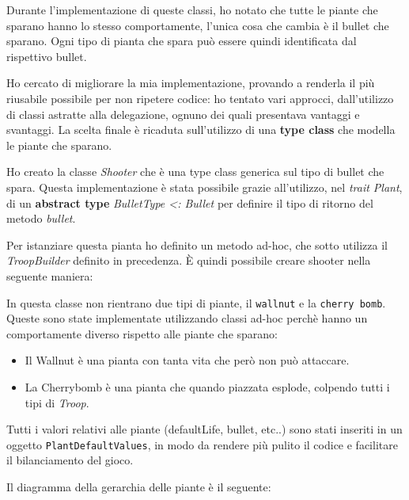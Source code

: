 Durante l'implementazione di queste classi, ho notato che tutte le piante che sparano hanno lo stesso comportamente, l'unica cosa che cambia è il bullet che sparano.
Ogni tipo di pianta che spara può essere quindi identificata dal rispettivo bullet.

Ho cercato di migliorare la mia implementazione, provando a renderla il più riusabile possibile per non ripetere codice: ho tentato vari approcci, dall'utilizzo di classi astratte alla delegazione, ognuno dei quali presentava vantaggi e svantaggi.
La scelta finale è ricaduta sull'utilizzo di una \textbf{type class} che modella le piante che sparano.

Ho creato la classe \textit{Shooter} che è una type class generica sul tipo di bullet che spara.
Questa implementazione è stata possibile grazie all'utilizzo, nel \textit{trait Plant}, di un \textbf{abstract type} \textit{BulletType \textless: Bullet} per definire il tipo di ritorno del metodo \textit{bullet}.



Per istanziare questa pianta ho definito un metodo ad-hoc, che sotto utilizza il \textit{TroopBuilder} definito in precedenza.
È quindi possibile creare shooter nella seguente maniera:



In questa classe non rientrano due tipi di piante, il \texttt{wallnut} e la \texttt{cherry bomb}.
Queste sono state implementate utilizzando classi ad-hoc perchè hanno un comportamente diverso rispetto alle piante che sparano:
\begin{itemize}
    \item Il Wallnut è una pianta con tanta vita che però non può attaccare.
    \item La Cherrybomb è una pianta che quando piazzata esplode, colpendo tutti i tipi di \textit{Troop}.
\end{itemize}

Tutti i valori relativi alle piante (defaultLife, bullet, etc..) sono stati inseriti in un oggetto \texttt{PlantDefaultValues},
in modo da rendere più pulito il codice e facilitare il bilanciamento del gioco.



Il diagramma della gerarchia delle piante è il seguente:

